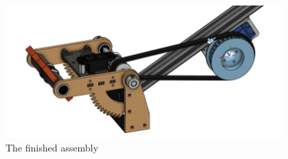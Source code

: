 \begin{figure}[htp]
\centering
\includegraphics[width=0.95\textwidth, angle=0]{Meetings/January/01-17-22/1-17-22_CAD_Figure5 - Nathan Forrer.JPG}
\caption{The finished assembly}
\label{fig:011722_8}
\end{figure}




